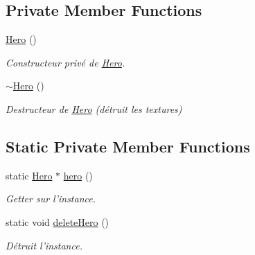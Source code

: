 \subsection*{Private Member Functions}
\begin{DoxyCompactItemize}
\item 
\hypertarget{classPropriete_1_1Hero_ab5920677a4b5cb59d6f513922d037dca}{\hyperlink{classPropriete_1_1Hero_ab5920677a4b5cb59d6f513922d037dca}{Hero} ()}\label{classPropriete_1_1Hero_ab5920677a4b5cb59d6f513922d037dca}

\begin{DoxyCompactList}\small\item\em Constructeur privé de \hyperlink{classPropriete_1_1Hero}{Hero}. \end{DoxyCompactList}\item 
\hypertarget{classPropriete_1_1Hero_a5aeef41ede5a80dc29c5acd7b553c4da}{\hyperlink{classPropriete_1_1Hero_a5aeef41ede5a80dc29c5acd7b553c4da}{$\sim$\-Hero} ()}\label{classPropriete_1_1Hero_a5aeef41ede5a80dc29c5acd7b553c4da}

\begin{DoxyCompactList}\small\item\em Destructeur de \hyperlink{classPropriete_1_1Hero}{Hero} (détruit les textures) \end{DoxyCompactList}\end{DoxyCompactItemize}
\subsection*{Static Private Member Functions}
\begin{DoxyCompactItemize}
\item 
\hypertarget{classPropriete_1_1Hero_a2b68b725d708acf0630e926f49d38b9d}{static \hyperlink{classPropriete_1_1Hero}{Hero} $\ast$ \hyperlink{classPropriete_1_1Hero_a2b68b725d708acf0630e926f49d38b9d}{hero} ()}\label{classPropriete_1_1Hero_a2b68b725d708acf0630e926f49d38b9d}

\begin{DoxyCompactList}\small\item\em Getter sur l'instance. \end{DoxyCompactList}\item 
\hypertarget{classPropriete_1_1Hero_a99f5ddf315aa22cd9a8e040743e46ea7}{static void \hyperlink{classPropriete_1_1Hero_a99f5ddf315aa22cd9a8e040743e46ea7}{delete\-Hero} ()}\label{classPropriete_1_1Hero_a99f5ddf315aa22cd9a8e040743e46ea7}

\begin{DoxyCompactList}\small\item\em Détruit l'instance. \end{DoxyCompactList}\end{DoxyCompactItemize}
